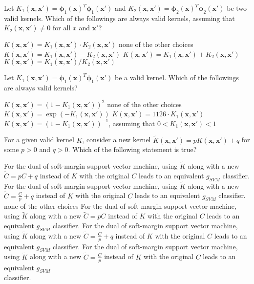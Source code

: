 \documentclass[a4paper,10pt]{exam}
\begin{document}
\begin{questions}
   \question Let $K_1(\mathbf{x}, \mathbf{x}') = {\boldsymbol\phi}_1(\mathbf{x}) ^T {\boldsymbol\phi}_1(\mathbf{x}')$ and $K_2(\mathbf{x}, \mathbf{x}') = {\boldsymbol\phi}_2(\mathbf{x}) ^T {\boldsymbol\phi}_2(\mathbf{x}')$ be two valid kernels. Which of the followings are always valid kernels, assuming that $K_2(\mathbf{x}, \mathbf{x}') \neq 0$ for all $x$ and $\mathbf{x}'$?
   \begin{choices}
   	 \CorrectChoice $K(\mathbf{x}, \mathbf{x}') = K_1(\mathbf{x}, \mathbf{x}') \cdot K_2(\mathbf{x}, \mathbf{x}')$
   	 \choice none of the other choices
   	 \choice $K(\mathbf{x}, \mathbf{x}') = K_1(\mathbf{x}, \mathbf{x}') - K_2(\mathbf{x}, \mathbf{x}')$
   	 \CorrectChoice $K(\mathbf{x}, \mathbf{x}') = K_1(\mathbf{x}, \mathbf{x}') + K_2(\mathbf{x}, \mathbf{x}')$
   	 \choice $K(\mathbf{x}, \mathbf{x}') = K_1(\mathbf{x}, \mathbf{x}') / K_2(\mathbf{x}, \mathbf{x}')$\\
   \end{choices}
   
   \question Let $K_1(\mathbf{x}, \mathbf{x}') = {\boldsymbol\phi}_1(\mathbf{x}) ^T {\boldsymbol\phi}_1(\mathbf{x}')$ be a valid kernel. Which of the followings are always valid kernels?
   \begin{choices}
   	 \choice $K(\mathbf{x}, \mathbf{x}') = (1 - K_1(\mathbf{x}, \mathbf{x}'))^{2}$
   	 \choice none of the other choices
   	 \choice $K(\mathbf{x}, \mathbf{x}') = \exp(-K_1(\mathbf{x}, \mathbf{x}'))$
   	 \CorrectChoice $K(\mathbf{x}, \mathbf{x}') = 1126 \cdot K_1(\mathbf{x}, \mathbf{x}')$
   	 \CorrectChoice $K(\mathbf{x}, \mathbf{x}') = (1 - K_1(\mathbf{x}, \mathbf{x}'))^{-1}$, assuming that $0 < K_1(\mathbf{x}, \mathbf{x}') < 1$\\
   \end{choices}
   
   \question For a given valid kernel $K$, consider a new kernel $\tilde{K}(\mathbf{x}, \mathbf{x}') = p K(\mathbf{x}, \mathbf{x}') + q$ for some $p>0$ and $q>0$. Which of the following statement is true?
  \begin{choices}
  	\choice For the dual of soft-margin support vector machine, using $\tilde{K}$ along with a new $\tilde{C} = pC + q$ instead of $K$ with the original $C$ leads to an equivalent $g_{SVM}$ classifier.
  	\choice For the dual of soft-margin support vector machine, using $\tilde{K}$ along with a new $\tilde{C} = \frac{C}{p} + q$ instead of $K$ with the original $C$ leads to an equivalent $g_{SVM}$ classifier.
  	\choice none of the other choices
    \choice For the dual of soft-margin support vector machine, using $\tilde{K}$ along with a new $\tilde{C} = pC$ instead of $K$ with the original $C$ leads to an equivalent $g_{SVM}$ classifier.
   	\choice For the dual of soft-margin support vector machine, using $\tilde{K}$ along with a new $\tilde{C} = \frac{C}{p} + q$ instead of $K$ with the original $C$ leads to an equivalent $g_{SVM}$ classifier.
  	\CorrectChoice For the dual of soft-margin support vector machine, using $\tilde{K}$ along with a new $\tilde{C} = \frac{C}{p}$ instead of $K$ with the original $C$ leads to an equivalent $g_{SVM}$\\ classifier.
  \end{choices}
  

\end{questions}
\end{document}
